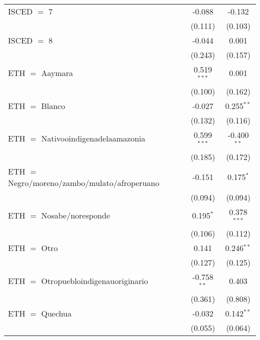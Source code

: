 \begin{table}[htbp!]
\begin{adjustbox}{width = 1\textwidth, max height = 0.95\textheight, center}
\begin{threeparttable}[b]
\begin{tabular}{lcc}
            ISCED $=$ 7                                   & -0.088        & -0.132\\   
                                                          & (0.111)       & (0.103)\\   
            ISCED $=$ 8                                   & -0.044        & 0.001\\   
                                                          & (0.243)       & (0.157)\\   
            ETH $=$ Aaymara                               & 0.519$^{***}$ & 0.001\\   
                                                          & (0.100)       & (0.162)\\   
            ETH $=$ Blanco                                & -0.027        & 0.255$^{**}$\\   
                                                          & (0.132)       & (0.116)\\   
            ETH $=$ Nativooindigenadelaamazonia           & 0.599$^{***}$ & -0.400$^{**}$\\   
                                                          & (0.185)       & (0.172)\\   
            ETH $=$ Negro/moreno/zambo/mulato/afroperuano & -0.151        & 0.175$^{*}$\\   
                                                          & (0.094)       & (0.094)\\   
            ETH $=$ Nosabe/noresponde                     & 0.195$^{*}$   & 0.378$^{***}$\\   
                                                          & (0.106)       & (0.112)\\   
            ETH $=$ Otro                                  & 0.141         & 0.246$^{**}$\\   
                                                          & (0.127)       & (0.125)\\   
            ETH $=$ Otropuebloindigenauoriginario         & -0.758$^{**}$ & 0.403\\   
                                                          & (0.361)       & (0.808)\\   
            ETH $=$ Quechua                               & -0.032        & 0.142$^{**}$\\   
                                                          & (0.055)       & (0.064)\\   

\end{tabular}
\end{threeparttable}
\end{adjustbox}
\end{table}
